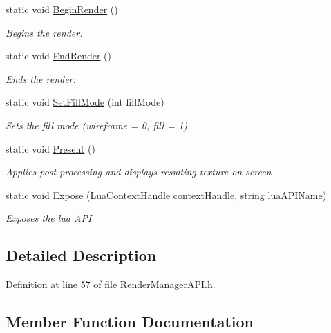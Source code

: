 \begin{DoxyCompactItemize}
static void \hyperlink{class_render_manager_a_p_i_a3989cd3076c42b1fc5f63239887dd5ca}{Begin\+Render} ()
\begin{DoxyCompactList}\small\item\em Begins the render. \end{DoxyCompactList}\item 
static void \hyperlink{class_render_manager_a_p_i_ab948dfb4627bbb9952937f24f658a975}{End\+Render} ()
\begin{DoxyCompactList}\small\item\em Ends the render. \end{DoxyCompactList}\item 
static void \hyperlink{class_render_manager_a_p_i_a08ba7b0522903295c3f71a2f0cdc396a}{Set\+Fill\+Mode} (int fill\+Mode)
\begin{DoxyCompactList}\small\item\em Sets the fill mode (wireframe = 0, fill = 1). \end{DoxyCompactList}\item 
static void \hyperlink{class_render_manager_a_p_i_a23ef04f5e7a2af15296e7cb948055eae}{Present} ()
\begin{DoxyCompactList}\small\item\em Applies post processing and displays resulting texture on screen \end{DoxyCompactList}\item 
static void \hyperlink{class_render_manager_a_p_i_adc398a413e346aa61f1866aa8a58deab}{Expose} (\hyperlink{_lua_context_8h_a2ffcc2d3ed21165072a1d7b61259bf14}{Lua\+Context\+Handle} context\+Handle, \hyperlink{_types_8h_ad453f9f71ce1f9153fb748d6bb25e454}{string} lua\+A\+P\+I\+Name)
\begin{DoxyCompactList}\small\item\em Exposes the lua A\+PI \end{DoxyCompactList}\end{DoxyCompactItemize}


\subsection{Detailed Description}


Definition at line 57 of file Render\+Manager\+A\+P\+I.\+h.



\subsection{Member Function Documentation}
